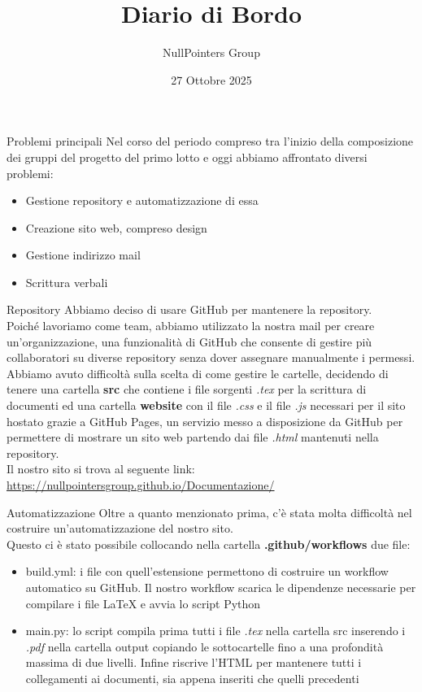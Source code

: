 \documentclass[11pt]{beamer}
\author{NullPointers Group}
\title{Diario di Bordo}
\institute{Università di Padova}
\date{27 Ottobre 2025}
\renewcommand{\emph}[1]{\textbf{#1}}
\begin{document}
\begin{frame}
\titlepage
\end{frame}

\begin{frame}{Problemi principali}
	Nel corso del periodo compreso tra l’inizio della composizione dei gruppi del progetto del primo lotto e oggi abbiamo affrontato diversi problemi:
	\begin{itemize}
		\item Gestione repository e automatizzazione di essa
		\item Creazione sito web, compreso design
		\item Gestione indirizzo mail
		\item Scrittura verbali
	\end{itemize}
\end{frame}

\begin{frame}{Repository}
	Abbiamo deciso di usare GitHub per mantenere la repository. \\
	Poiché lavoriamo come team, abbiamo utilizzato la nostra mail per creare un’organizzazione, una funzionalità di GitHub che consente di gestire più collaboratori su diverse repository senza dover assegnare manualmente i permessi.\\
	Abbiamo avuto difficoltà sulla scelta di come gestire le cartelle, decidendo di tenere una cartella \emph{src} che contiene i file sorgenti \textit{.tex} per la scrittura di documenti ed una cartella \emph{website} con il file \textit{.css} e il file \textit{.js} necessari per il sito hostato grazie a GitHub Pages, un servizio messo a disposizione da GitHub per permettere di mostrare un sito web partendo dai file \textit{.html} mantenuti nella repository. \\
	Il nostro sito si trova al seguente link: \url{https://nullpointersgroup.github.io/Documentazione/}
\end{frame}

\begin{frame}{Automatizzazione}
	Oltre a quanto menzionato prima, c'è stata molta difficoltà nel costruire un'automatizzazione del nostro sito.\\
	Questo ci è stato possibile collocando nella cartella \emph{.github/workflows} due file: 
	\begin{itemize}
		\item build.yml: i file con quell'estensione permettono di costruire un workflow automatico su GitHub. Il nostro workflow scarica le dipendenze necessarie per compilare i file LaTeX e avvia lo script Python
		\item main.py: lo script compila prima tutti i file \textit{.tex} nella cartella src inserendo i \textit{.pdf} nella cartella output copiando le sottocartelle fino a una profondità massima di due livelli. Infine riscrive l'HTML per mantenere tutti i collegamenti ai documenti, sia appena inseriti che quelli precedenti
	\end{itemize}
\end{frame}
\end{document}
